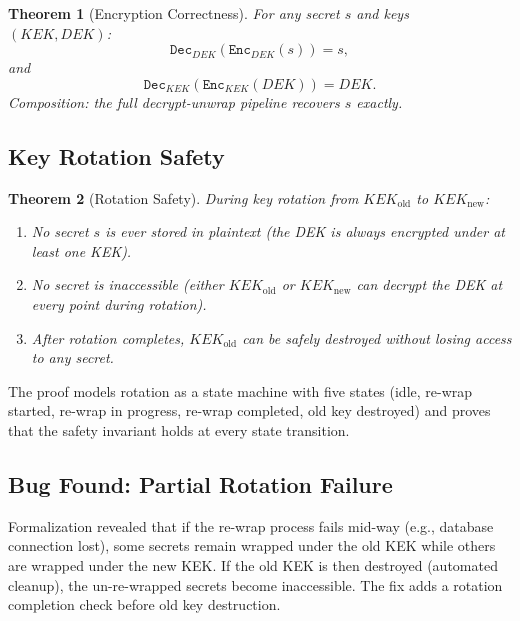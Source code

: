 \documentclass[11pt]{article}
\newtheorem{theorem}{Theorem}
\begin{document}
\begin{theorem}[Encryption Correctness]
For any secret $s$ and keys $(KEK, DEK)$:
\begin{equation}
\texttt{Dec}_{DEK}(\texttt{Enc}_{DEK}(s)) = s,
\end{equation}
and
\begin{equation}
\texttt{Dec}_{KEK}(\texttt{Enc}_{KEK}(DEK)) = DEK.
\end{equation}
Composition: the full decrypt-unwrap pipeline recovers $s$ exactly.
\end{theorem}

\subsection{Key Rotation Safety}

\begin{theorem}[Rotation Safety]
During key rotation from $KEK_{\text{old}}$ to $KEK_{\text{new}}$:
\begin{enumerate}[leftmargin=1.4em]
    \item No secret $s$ is ever stored in plaintext (the DEK is always
    encrypted under at least one KEK).
    \item No secret is inaccessible (either $KEK_{\text{old}}$ or
    $KEK_{\text{new}}$ can decrypt the DEK at every point during rotation).
    \item After rotation completes, $KEK_{\text{old}}$ can be safely destroyed
    without losing access to any secret.
\end{enumerate}
\end{theorem}

The proof models rotation as a state machine with five states (idle, re-wrap
started, re-wrap in progress, re-wrap completed, old key destroyed) and proves
that the safety invariant holds at every state transition.

\subsection{Bug Found: Partial Rotation Failure}

Formalization revealed that if the re-wrap process fails mid-way (e.g.,
database connection lost), some secrets remain wrapped under the old KEK while
others are wrapped under the new KEK. If the old KEK is then destroyed
(automated cleanup), the un-re-wrapped secrets become inaccessible. The fix
adds a rotation completion check before old key destruction.
\end{document}
